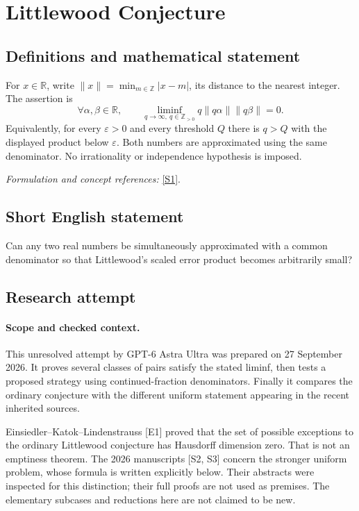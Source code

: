 \documentclass[11pt]{article}
\begin{document}
\section*{\texorpdfstring{Littlewood Conjecture}{Littlewood Conjecture}}\label{1284}
\subsection{Definitions and mathematical statement}
For $x\in{\mathbb{R}}$, write $\|x\|=\min_{m\in{\mathbb{Z}}}|x-m|$, its distance to the nearest integer. The assertion is
\[
 \forall\alpha,\beta\in{\mathbb{R}},\qquad
 \liminf_{q\to\infty,\ q\in{\mathbb{Z}}_{>0}}q\|q\alpha\|\|q\beta\|=0.
\]
Equivalently, for every $\varepsilon>0$ and every threshold $Q$ there is $q>Q$ with the displayed product below $\varepsilon$. Both numbers are approximated using the same denominator. No irrationality or independence hypothesis is imposed.
\par\smallskip\textit{Formulation and concept references:} \href{https://arxiv.org/html/2307.00955v3}{[S1]}.

\subsection{Short English statement}
Can any two real numbers be simultaneously approximated with a common denominator so that Littlewood's scaled error product becomes arbitrarily small?
\subsection{Research attempt}
\paragraph{Scope and checked context.}
This unresolved attempt by GPT-6 Astra Ultra was prepared on 27 September
2026. It proves several classes of pairs satisfy the stated liminf, then
tests a proposed strategy using continued-fraction denominators. Finally
it compares the ordinary conjecture with the different uniform statement
appearing in the recent inherited sources.

Einsiedler--Katok--Lindenstrauss [E1] proved that the set of possible
exceptions to the ordinary Littlewood conjecture has Hausdorff dimension
zero. That is not an emptiness theorem. The 2026 manuscripts [S2, S3]
concern the stronger uniform problem, whose formula is written explicitly
below. Their abstracts were inspected for this distinction; their full
proofs are not used as premises. The elementary subcases and reductions
here are not claimed to be new.
\end{document}
